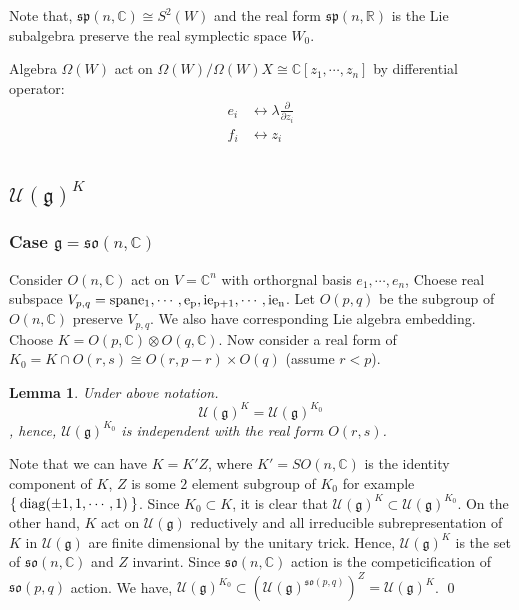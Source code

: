 \documentclass[12pt]{article}
\newtheorem{lemma}{Lemma}
\def\bR{{\mathbb{R}}}
\def\bC{{\mathbb{C}}}
\def\sspan{\rm{span}}
\def\sp{{\mathfrak{sp}}}
\def\aso{\mathfrak{so}}
\def\diag#1{\mathrm{diag}(#1)}
\def\fgg{\mathfrak{g}}
\def\cuu{\mathcal{U}}
\begin{document}
Note that, $\sp(n,\bC)\cong S^2(W)$ and the real form $\sp(n,\bR)$ is the 
Lie subalgebra preserve the real symplectic space $W_0$. 



Algebra $\Omega(W)$ act on $\Omega(W)/\Omega(W)X \cong \bC[z_1, \cdots,z_n]$ by differential operator:
\begin{align*}
e_i &\leftrightarrow \lambda \frac{\partial}{\partial z_i}\\
f_i &\leftrightarrow z_i\\
\end{align*}

\subsection{$\cuu(\fgg)^K$}
\subsubsection{Case $\fgg=\aso(n,\bC)$} 
Consider $O(n,\bC)$ act on $V=\bC^n$ with orthorgnal basis $e_1, \cdots, e_n$, 
Choese real subspace $V_{p,q} = \sspan{e_1, \cdots, e_p, ie_{p+1},\cdots, ie_n}$.
Let $O(p,q)$ be the subgroup of $O(n,\bC)$ preserve $V_{p,q}$. We also have corresponding Lie algebra embedding. 
Choose $K = O(p,\bC)\otimes O(q,\bC)$. Now consider a real form of 
$K_0 = K\cap O(r,s) \cong O(r,p-r)\times O(q)$ (assume $r<p$).

\begin{lemma} Under above notation.
\[\cuu(\fgg)^{K} = \cuu(\fgg)^{K_0}\], 
hence, $\cuu(\fgg)^{K_0}$ is independent with the real form $O(r,s)$. 
\end{lemma}
\proof Note that we can have $K=K'Z$, where $K' = SO(n,\bC)$ is the identity component of
 $K$, $Z$ is some $2$ element subgroup of $K_0$ 
for example $\Set{\diag{\pm 1,1, \cdots, 1}}$. Since $K_0\subset K$, 
it is clear that $\cuu(\fgg)^K\subset \cuu(\fgg)^{K_0}$.
On the other hand, $K$ act on $\cuu(\fgg)$ reductively
and all irreducible subrepresentation of $K$ in $\cuu(\fgg)$ 
are finite dimensional by the unitary trick. Hence, 
$\cuu(\fgg)^K$ is the set of $\aso(n,\bC)$ and $Z$ invarint.
Since $\aso(n,\bC)$ action is the competicification of $\aso(p,q)$ action.
We have, $\cuu(\fgg)^{K_0} \subset (\cuu(\fgg)^{\aso(p,q)})^Z = \cuu(\fgg)^K$.
\qed
\end{document}
